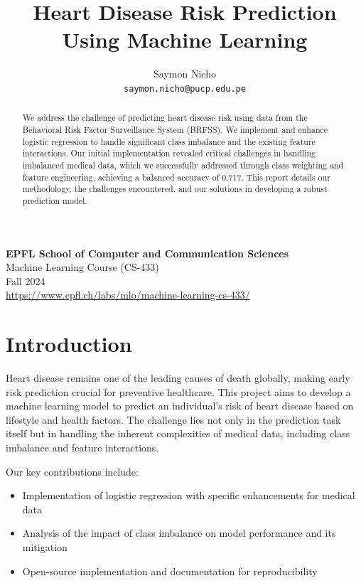 \documentclass[10pt,conference,compsocconf]{IEEEtran}
\begin{document}
\title{Heart Disease Risk Prediction Using Machine Learning}

\author{
    Saymon Nicho\\
    \texttt{saymon.nicho@pucp.edu.pe}
}

\maketitle

\begin{center}
\textbf{EPFL School of Computer and Communication Sciences}\\
Machine Learning Course (CS-433)\\
Fall 2024\\
\url{https://www.epfl.ch/labs/mlo/machine-learning-cs-433/}
\end{center}

\vspace{1em}

\begin{abstract}
We address the challenge of predicting heart disease risk using data from the
Behavioral Risk Factor Surveillance System (BRFSS). We implement and enhance
logistic regression to handle significant class imbalance and the existing feature interactions.
Our initial implementation revealed critical challenges in handling imbalanced medical data,
which we successfully addressed through class weighting and feature engineering,
achieving a balanced accuracy of 0.717. This report details our methodology,
the challenges encountered, and our solutions in developing a robust prediction model.
\end{abstract}

\section{Introduction}
Heart disease remains one of the leading causes of death globally, making early risk
prediction crucial for preventive healthcare. This project aims to develop a
machine learning model to predict an individual's risk of heart disease based on
lifestyle and health factors. The challenge lies not only in the prediction task itself
but in handling the inherent complexities of medical data, including class imbalance and
feature interactions.

Our key contributions include:
\begin{itemize}
    \item Implementation of logistic regression with specific enhancements for medical data
    \item Analysis of the impact of class imbalance on model performance and its mitigation
    \item Open-source implementation and documentation for reproducibility
\end{itemize}
\end{document}

